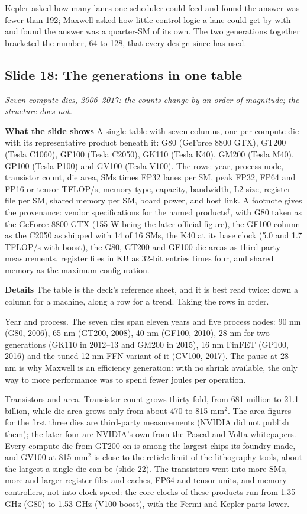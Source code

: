 \documentclass[11pt,letterpaper]{article}
\newcommand{\slide}[3]{%
  \subsection[Slide #1: #2]{Slide #1: #2}%
  {\color{muted}\itshape #3\par}\medskip}
\newcommand{\para}[1]{\medskip\noindent\textbf{#1}\quad}
\newenvironment{intuition}{\begin{tcolorbox}[intuitionbox]}{\end{tcolorbox}}
\begin{document}
\begin{intuition}
Kepler asked how many lanes one scheduler could feed and found the answer was fewer than 192; Maxwell asked how little control logic a lane could get by with and found the answer was a quarter-SM of its own. The two generations together bracketed the number, 64 to 128, that every design since has used.
\end{intuition}

\slide{18}{The generations in one table}{Seven compute dies, 2006--2017: the counts change by an order of magnitude; the structure does not.}

\para{What the slide shows} A single table with seven columns, one per compute die with its representative product beneath it: G80 (GeForce 8800 GTX), GT200 (Tesla C1060), GF100 (Tesla C2050), GK110 (Tesla K40), GM200 (Tesla M40), GP100 (Tesla P100) and GV100 (Tesla V100). The rows: year, process node, transistor count, die area, SMs times FP32 lanes per SM, peak FP32, FP64 and FP16-or-tensor TFLOP/s, memory type, capacity, bandwidth, L2 size, register file per SM, shared memory per SM, board power, and host link. A footnote gives the provenance: vendor specifications for the named products$^\dagger$, with G80 taken as the GeForce 8800 GTX (155 W being the later official figure), the GF100 column as the C2050 as shipped with 14 of 16 SMs, the K40 at its base clock (5.0 and 1.7 TFLOP/s with boost), the G80, GT200 and GF100 die areas as third-party measurements, register files in KB as 32-bit entries times four, and shared memory as the maximum configuration.

\para{Details} The table is the deck's reference sheet, and it is best read twice: down a column for a machine, along a row for a trend. Taking the rows in order.

Year and process. The seven dies span eleven years and five process nodes: 90 nm (G80, 2006), 65 nm (GT200, 2008), 40 nm (GF100, 2010), 28 nm for two generations (GK110 in 2012--13 and GM200 in 2015), 16 nm FinFET (GP100, 2016) and the tuned 12 nm FFN variant of it (GV100, 2017). The pause at 28 nm is why Maxwell is an efficiency generation: with no shrink available, the only way to more performance was to spend fewer joules per operation.

Transistors and area. Transistor count grows thirty-fold, from 681 million to 21.1 billion, while die area grows only from about 470 to 815 mm$^2$. The area figures for the first three dies are third-party measurements (NVIDIA did not publish them); the later four are NVIDIA's own from the Pascal and Volta whitepapers. Every compute die from GT200 on is among the largest chips its foundry made, and GV100 at 815 mm$^2$ is close to the reticle limit of the lithography tools, about the largest a single die can be (slide 22). The transistors went into more SMs, more and larger register files and caches, FP64 and tensor units, and memory controllers, not into clock speed: the core clocks of these products run from 1.35 GHz (G80) to 1.53 GHz (V100 boost), with the Fermi and Kepler parts lower.
\end{document}
